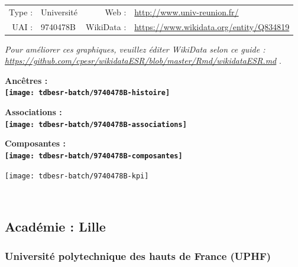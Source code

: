 \documentclass[12pt,french,]{article}
\begin{document}
\begin{tabular*}{\textwidth}{rp{5cm}rl}  
\hline  
Type : & Université & Web : &\href{http://www.univ-reunion.fr/}{http://www.univ-reunion.fr/} \\  
UAI : & 9740478B & WikiData : & \href{https://www.wikidata.org/entity/Q834819}{https://www.wikidata.org/entity/Q834819} \\  
\hline  
\end{tabular*}

\textit{\scriptsize Pour améliorer ces graphiques, veuillez éditer WikiData selon ce guide :  \href{https://github.com/cpesr/wikidataESR/blob/master/Rmd/wikidataESR.md}{https://github.com/cpesr/wikidataESR/blob/master/Rmd/wikidataESR.md}}
.

\vspace{1cm}  
\begin{minipage}[b]{0.50\textwidth}\begin{center} \bf Ancêtres : \\  
\texttt{[image: tdbesr-batch/9740478B-histoire]} \end{center}\end{minipage}\begin{minipage}[b]{0.50\textwidth}\begin{center} \bf Associations : \\  
\texttt{[image: tdbesr-batch/9740478B-associations]} \end{center}\end{minipage}

\hrulefill

\begin{center} \bf Composantes : \\  
\texttt{[image: tdbesr-batch/9740478B-composantes]} \end{center}

\begin{center}\texttt{[image: tdbesr-batch/9740478B-kpi]} \end{center}\checkoddpage

\ifoddpage \fi ~\newpage  

\hypertarget{acaduxe9mie-lille}{%
\subsection{Académie : Lille}\label{acaduxe9mie-lille}}

\hypertarget{universituxe9-polytechnique-des-hauts-de-france-uphf}{%
\subsubsection{Université polytechnique des hauts de France
(UPHF)}\label{universituxe9-polytechnique-des-hauts-de-france-uphf}}
\end{document}
